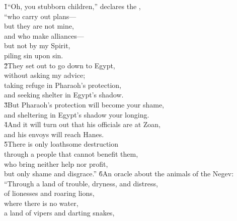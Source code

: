 \begin{poetry}
\poeml {}
\v{1}``Oh, you stubborn children,'' declares the , \\
\poeml ``who carry out plans--- \\
\poemll    but they are not mine, \\
\poeml and who make alliances--- \\
\poemll    but not by my Spirit, \\
\poemlll       piling sin upon sin. \\
\poeml \v{2}They set out to go down to Egypt, \\
\poemll    without asking my advice; \\
\poeml taking refuge in Pharaoh's protection, \\
\poemll    and seeking shelter in Egypt's shadow. \\
\poeml \v{3}But Pharaoh's protection will become your shame, \\
\poemll    and sheltering in Egypt's shadow your longing. \\
\poeml \v{4}And it will turn out that his officials are at Zoan, \\
\poemll    and his envoys will reach Hanes. \\
\poeml \v{5}There is only loathsome destruction \\
\poemll    through a people that cannot benefit them, \\
\poeml who bring neither help nor profit, \\
\poemll    but only shame and disgrace.''
\poeml \v{6}An oracle about the animals of the Negev: \\
\poeml ``Through a land of trouble, dryness, and distress, \\
\poemll    of lionesses and roaring lions, \\
\poemlll       where there is no water, \\
\poeml a land of vipers and darting snakes, \\

\end{poetry}
